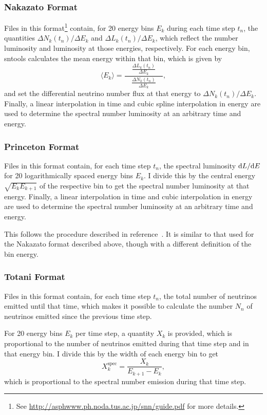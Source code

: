 \documentclass[11pt, oneside]{article}
\renewcommand{\d}{\mathrm{d}}
\newcommand{\tdiffx}[3][\empty]{\ifx\empty#1
		\d #2 / \d #3
	\else
		\d^{#1} #2 / \d #3^{#1}
	\fi} %
\newcommand{\mean}[1]{\ensuremath{\langle #1 \rangle}}
\begin{document}
\subsubsection{Nakazato Format}
Files in this format\footnote{See \url{http://asphwww.ph.noda.tus.ac.jp/snn/guide.pdf} for more details.} contain, for 20 energy bins $E_k$ during each time step $t_n$, the quantities $\Delta N_k (t_n) / \Delta E_k$ and $\Delta L_k (t_n) / \Delta E_k$, which reflect the number luminosity and luminosity at those energies, respectively.
For each energy bin, sntools calculates the mean energy within that bin, which is given by
\begin{equation}
\mean{E_k} = \frac{\quad  \frac{\Delta L_k (t_n)}{\Delta E_k}  \quad}{  \frac{\Delta N_k (t_n)}{\Delta E_k}  },
\end{equation}
and set the differential neutrino number flux at that energy to $\Delta N_k (t_n) / \Delta E_k$.
Finally, a linear interpolation in time and cubic spline interpolation in energy are used to determine the spectral number luminosity at an arbitrary time and energy. %

\subsubsection{Princeton Format}
Files in this format contain, for each time step $t_n$, the spectral luminosity $\tdiffx{L}{E}$ for 20 logarithmically spaced energy bins $E_k$.
I divide this by the central energy $\sqrt{E_k E_{k+1}}$ of the respective bin to get the spectral number luminosity at that energy.
Finally, a linear interpolation in time and cubic interpolation in energy are used to determine the spectral number luminosity at an arbitrary time and energy.

This follows the procedure described in reference~\cite{Seadrow2018}.
It is similar to that used for the Nakazato format described above, though with a different definition of the bin energy.

\subsubsection{Totani Format}
Files in this format contain, for each time step $t_n$, the total number of neutrinos emitted until that time, which makes it possible to calculate the number $N_n$ of neutrinos emitted since the previous time step.

For 20 energy bins $E_k$ per time step, a quantity $X_k$ is provided, which is proportional to the number of neutrinos emitted during that time step and in that energy bin.
I divide this by the width of each energy bin to get
\begin{equation}
X_k^\text{spec} = \frac{X_k}{E_{k+1} - E_k},
\end{equation}
which is proportional to the spectral number emission during that time step.
\end{document}
